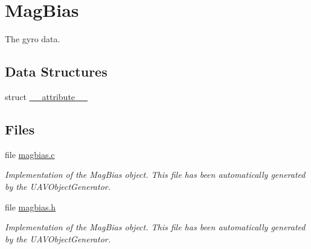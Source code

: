 \hypertarget{group___mag_bias}{\section{\-Mag\-Bias}
\label{group___mag_bias}
}


\-The gyro data.  


\subsection*{\-Data \-Structures}
\begin{DoxyCompactItemize}
\item 
struct \hyperlink{struct____attribute____}{\-\_\-\-\_\-attribute\-\_\-\-\_\-}
\end{DoxyCompactItemize}
\subsection*{\-Files}
\begin{DoxyCompactItemize}
\item 
file \hyperlink{magbias_8c}{magbias.\-c}
\begin{DoxyCompactList}\small\item\em \-Implementation of the \-Mag\-Bias object. \-This file has been automatically generated by the \-U\-A\-V\-Object\-Generator. \end{DoxyCompactList}\item 
file \hyperlink{magbias_8h}{magbias.\-h}
\begin{DoxyCompactList}\small\item\em \-Implementation of the \-Mag\-Bias object. \-This file has been automatically generated by the \-U\-A\-V\-Object\-Generator. \end{DoxyCompactList}\end{DoxyCompactItemize}
